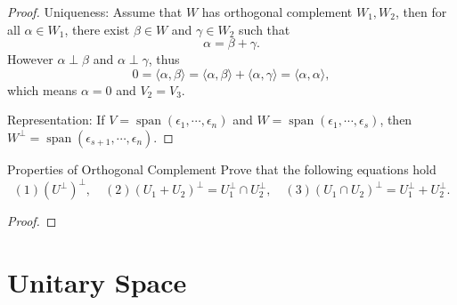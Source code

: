 \begin{proof}
  Uniqueness: Assume that $W$ has orthogonal complement $W_1, W_2$,
  then for all $\alpha \in W_1$,
  there exist $\beta \in W$ and $\gamma \in W_2$ such that
  \begin{equation}
    \alpha = \beta + \gamma.
  \end{equation}
  However $\alpha \perp \beta$ and $\alpha \perp \gamma$,
  thus
  \begin{equation}
    0 = \langle \alpha, \beta \rangle = \langle \alpha, \beta \rangle
    + \langle \alpha, \gamma\rangle = \langle \alpha, \alpha \rangle,
  \end{equation}
  which means $\alpha = 0$ and $V_2 = V_3$.

  Representation: If $V = \operatorname{span}(\epsilon_1,\cdots,\epsilon_n)$ and
  $W = \operatorname{span}(\epsilon_1,\cdots,\epsilon_s)$,
  then $W^{\perp} = \operatorname{span}(\epsilon_{s+1},\cdots,\epsilon_n)$.
\end{proof}


\begin{example}{Properties of Orthogonal Complement}{}
  Prove that the following equations hold
  \begin{equation}
    (1) (U^{\perp})^{\perp}, \quad
    (2) (U_1 + U_2)^{\perp} = U_1^{\perp} \cap U_2^{\perp}, \quad
    (3) (U_1 \cap U_2)^{\perp} = U_1^{\perp} + U_2^{\perp}.
  \end{equation}
\end{example}

\begin{proof}
  
\end{proof}

\section{Unitary Space}









